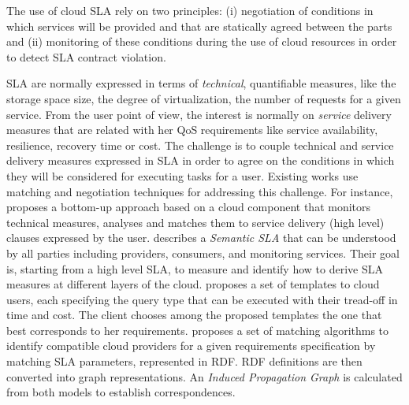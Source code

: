 The use of cloud SLA rely on two principles: (i)  negotiation of conditions in which services will be provided and that are statically agreed between the parts and (ii)  monitoring of these conditions during the use of cloud resources in order to detect SLA contract violation.
 
SLA are normally expressed in terms of \textit{technical}, quantifiable measures, like the storage space size, the degree of virtualization, the number of requests for a given service. 
From the user point of view, the interest is normally on \textit{service} delivery measures that are related with her QoS requirements like service availability, resilience, recovery time or cost.
The challenge is to couple technical and service delivery measures expressed in SLA in order to agree on the conditions in which they will be considered for executing tasks for a user. Existing works use matching and negotiation techniques for addressing this challenge.  
For instance,~\cite{5547150} 
proposes a bottom-up approach based on a cloud component that monitors technical measures, analyses and matches them to service delivery (high level) clauses expressed by the user.
\cite{Dastjerdi:2012:DOA:2275356.2275360} describes a \textit{Semantic SLA} that can be understood by all parties including providers, consumers, and monitoring services.
Their goal is, starting from a high level SLA, to measure and identify how to derive SLA measures  at different layers of the cloud.  
\cite{Ortiz:2013:VPS:2486767.2486772} proposes a set of templates to cloud users, each specifying the query type that can be executed with their tread-off in time and cost.  
The client  chooses among the proposed templates the one that best corresponds   to her requirements. \cite{6141307} proposes a set of matching algorithms to identify compatible cloud providers for a given requirements specification by matching SLA parameters, represented in RDF. RDF definitions are then converted into graph representations. An \textit{Induced Propagation Graph} is calculated from both models to establish correspondences.



